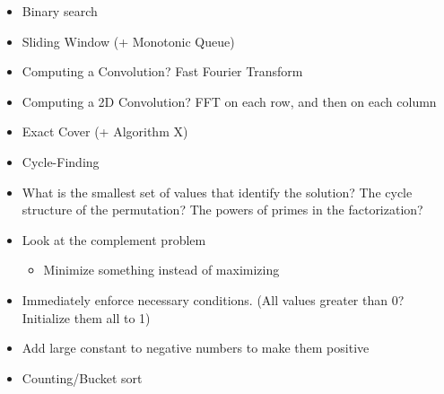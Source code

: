 \documentclass[11.5pt,a4paper,landscape,oneside]{amsart}
\newenvironment{myitemize}
{ \begin{itemize}[leftmargin=.5cm]
    \setlength{\itemsep}{0pt}
    \setlength{\parskip}{0pt}
    \setlength{\parsep}{0pt}     }
{ \end{itemize}                  }
\begin{document}
\begin{multicols*}{2}
\begin{myitemize}
                \item Binary search
                \item Sliding Window (+ Monotonic Queue)
                \item Computing a Convolution? Fast Fourier Transform
                \item Computing a 2D Convolution? FFT on each row, and then on each column
                \item Exact Cover (+ Algorithm X)
                \item Cycle-Finding
                \item What is the smallest set of values that identify the solution? The cycle structure of the permutation? The powers of primes in the factorization?
                \item Look at the complement problem
                    \begin{itemize}
                        \item Minimize something instead of maximizing
                    \end{itemize}
                \item Immediately enforce necessary conditions. (All values greater than 0? Initialize them all to 1)
                \item Add large constant to negative numbers to make them positive
                \item Counting/Bucket sort
            \end{myitemize}
	\clearpage

\end{multicols*}
\end{document}
